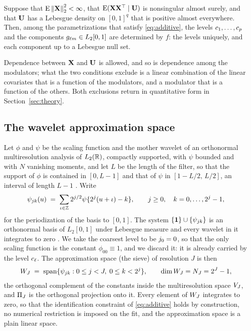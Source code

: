 \begin{proposition}[Identification]
\label{prop:identif}
Suppose that $\mathrm{E}\left\lVert \mathbf{X} \right\rVert_2^2 < \infty$, that $\mathrm{E}(\mathbf{X}\mathbf{X}^{\top} \mid \mathbf{U})$ is
nonsingular almost surely, and that $\mathbf{U}$ has a Lebesgue density on $[0,1]^q$
that is positive almost everywhere. Then, among the parametrizations that
satisfy \eqref{eq:additive}, the levels $c_{1},\dots,c_{p}$ and the
components $g_{\ell m} \in L_2[0,1]$ are determined by $f$: the levels
uniquely, and each component up to a Lebesgue null set.
\end{proposition}

Dependence between $\mathbf{X}$ and $\mathbf{U}$ is allowed, and so is dependence among the
modulators; what the two conditions exclude is a linear combination of the
linear covariates that is a function of the modulators, and a modulator that
is a function of the others. Both exclusions return in quantitative form in
Section~\ref{sec:theory}.

\subsection{The wavelet \texorpdfstring{approximation space}{approximation space}}
\label{sec:sieve}

Let $\phi$ and $\psi$ be the scaling function and the mother wavelet of an
orthonormal multiresolution analysis of $L_2(\mathbb{R})$, compactly supported, with
$\psi$ bounded and with $N$ vanishing moments, and let $L$ be the length of
the filter, so that the support of $\phi$ is contained in $[0,L-1]$ and that of $\psi$ in $[1-L/2,\,L/2]$, an interval of length $L-1$ \citep[Chapter~7]{hardle1998wavelets}. Write
\begin{equation}
  \label{eq:periodized}
  \psi_{jk}(u) \;=\; \sum_{\iota \in \mathbb{Z}}
  2^{j/2}\psi\{2^{j}(u+\iota) - k\},
  \qquad j \ge 0, \quad k = 0,\dots,2^{j}-1,
\end{equation}
for the periodization of the basis to $[0,1]$. The system
$\{\mathbf{1}\}\cup\{\psi_{jk}\}$ is an orthonormal basis of
$L_2[0,1]$ under Lebesgue measure and every wavelet in it integrates to zero
\citep[Section 9.3]{Daubechies-1992}. We take the coarsest level to be
$j_{0} = 0$, so that the only scaling function is the constant
$\phi_{00}\equiv 1$, and we discard it: it is already carried by the level
$c_{\ell}$. The approximation space (the sieve) of resolution $J$ is then
\[
  W_{J} \;=\; \mathrm{span}\{\psi_{jk} : 0 \le j < J,\;
  0 \le k < 2^{j}\},
  \qquad \dim W_{J} = N_{J} = 2^{J}-1,
\]
the orthogonal complement of the constants inside the multiresolution space
$V_{J}$, and $\Pi_{J}$ is the orthogonal projection onto it. Every element of $W_{J}$
integrates to zero, so that the identification constraint of
\eqref{eq:additive} holds by construction, no numerical restriction is imposed
on the fit, and the approximation space is a plain linear space.

